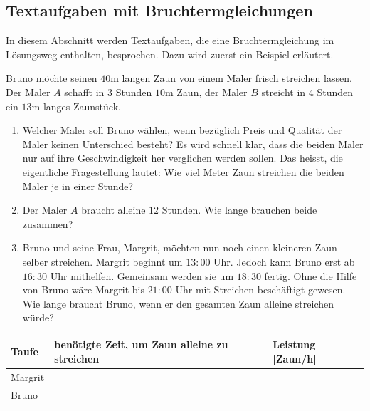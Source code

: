 \documentclass[11pt,oneside]{article}
\begin{document}
\subsection{Textaufgaben mit Bruchtermgleichungen}
	In diesem Abschnitt werden Textaufgaben, die eine Bruchtermgleichung im Lösungsweg enthalten, besprochen. Dazu wird zuerst ein Beispiel erläutert.
	\begin{beispiel} %
		Bruno möchte seinen $40$m langen Zaun von einem Maler frisch streichen lassen. Der Maler $A$ schafft in $3$ Stunden $10$m Zaun, der Maler $B$ streicht in $4$ Stunden ein $13$m langes Zaunstück.
		\begin{enumerate}[label=\alph*)]
			\item Welcher Maler soll Bruno wählen, wenn bezüglich Preis und Qualität der Maler keinen Unterschied besteht?\newline
			Es wird schnell klar, dass die beiden Maler nur auf ihre Geschwindigkeit her verglichen werden sollen. Das heisst, die eigentliche Fragestellung lautet:\newline
			Wie viel Meter Zaun streichen die beiden Maler je in einer Stunde?
		\end{enumerate}
		\vspace{5pt}
		\begin{enumerate}[label=\alph*)]\setcounter{enumi}{1}
			\item Der Maler $A$ braucht alleine $12$ Stunden. Wie lange brauchen beide zusammen?
		\end{enumerate}
		\vspace{5pt}
		\begin{enumerate}[label=\alph*)]\setcounter{enumi}{2}
			\item Bruno und seine Frau, Margrit, möchten nun noch einen kleineren Zaun selber streichen. Margrit beginnt um $13:00$ Uhr. Jedoch kann Bruno erst ab $16:30$ Uhr mithelfen. Gemeinsam werden sie um $18:30$ fertig. Ohne die Hilfe von Bruno wäre Margrit bis $21:00$ Uhr mit Streichen beschäftigt gewesen. Wie lange braucht Bruno, wenn er den gesamten Zaun alleine streichen würde?
		\end{enumerate}
		\begin{table}[ht]
			\centering
			\begin{tabular}{|p{4.5cm}|p{4.5cm}|p{4.5cm}|}\hline
				Taufe\newline & benötigte Zeit, um Zaun alleine zu streichen & Leistung [Zaun/h]\\\hline
				Margrit\newline & & \\\hline
				Bruno\newline &  &  \\\hline
			\end{tabular}
		\end{table}
		\vspace{5pt}
	\end{beispiel}
\end{document}
